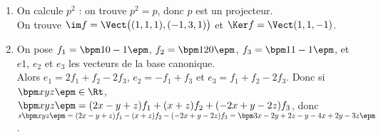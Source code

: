 \begin{enumerate}
\item On calcule $p^2$ : on trouve $p^2=p$, donc $p$ est un projecteur.\\
On trouve $\im f= \Vect\big((1,1,1),(-1,3,1)\big)$ et $\Ker f=\Vect(1,1,-1)$.
\item On pose $f_1=\bpm 1\\0\\-1\epm$, $f_2=\bpm 1\\2\\0\epm$, $f_3=\bpm 1\\1\\-1\epm$, et $e1$, $e_2$ et $e_3$ les vecteurs de la base canonique.\\
Alors $e_1=2f_1+f_2-2f_3$, $e_2=-f_1+f_3$ et $e_3=f_1+f_2-2f_3$. Donc si $\bpm x\\y\\z\epm\in\Rt$, $\bpm x\\y\\z\epm=(2x-y+z)f_1+(x+z)f_2+(-2x+y-2z)f_3$, donc $s\bpm x\\y\\z\epm=(2x-y+z)f_1-(x+z)f_2-(-2x+y-2z)f_3=\bpm 3x-2y+2z\\-y\\-4x+2y-3z\epm$.
\end{enumerate}


